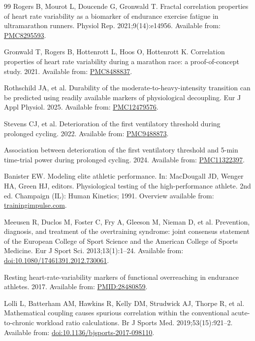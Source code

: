 \documentclass[11pt]{article}
\begin{document}
\begin{thebibliography}{99}
 Rogers B, Mourot L, Doucende G, Gronwald T. Fractal correlation properties of heart rate variability as a biomarker of endurance exercise fatigue in ultramarathon runners. Physiol Rep. 2021;9(14):e14956. Available from: \href{https://pmc.ncbi.nlm.nih.gov/articles/PMC8295593/}{PMC8295593}.

 Gronwald T, Rogers B, Hottenrott L, Hoos O, Hottenrott K. Correlation properties of heart rate variability during a marathon race: a proof-of-concept study. 2021. Available from: \href{https://pmc.ncbi.nlm.nih.gov/articles/PMC8488837/}{PMC8488837}.

 Rothschild JA, et al. Durability of the moderate-to-heavy-intensity transition can be predicted using readily available markers of physiological decoupling. Eur J Appl Physiol. 2025. Available from: \href{https://pmc.ncbi.nlm.nih.gov/articles/PMC12479576/}{PMC12479576}.

 Stevens CJ, et al. Deterioration of the first ventilatory threshold during prolonged cycling. 2022. Available from: \href{https://pmc.ncbi.nlm.nih.gov/articles/PMC9488873/}{PMC9488873}.

 Association between deterioration of the first ventilatory threshold and 5-min time-trial power during prolonged cycling. 2024. Available from: \href{https://pmc.ncbi.nlm.nih.gov/articles/PMC11322397/}{PMC11322397}.

 Banister EW. Modeling elite athletic performance. In: MacDougall JD, Wenger HA, Green HJ, editors. Physiological testing of the high-performance athlete. 2nd ed. Champaign (IL): Human Kinetics; 1991. Overview available from: \href{https://www.trainingimpulse.com/banisters-trimp-0}{trainingimpulse.com}.

 Meeusen R, Duclos M, Foster C, Fry A, Gleeson M, Nieman D, et al. Prevention, diagnosis, and treatment of the overtraining syndrome: joint consensus statement of the European College of Sport Science and the American College of Sports Medicine. Eur J Sport Sci. 2013;13(1):1--24. Available from: \href{https://onlinelibrary.wiley.com/doi/10.1080/17461391.2012.730061}{doi:10.1080/17461391.2012.730061}.

 Resting heart-rate-variability markers of functional overreaching in endurance athletes. 2017. Available from: \href{https://pubmed.ncbi.nlm.nih.gov/28480859/}{PMID:28480859}.

 Lolli L, Batterham AM, Hawkins R, Kelly DM, Strudwick AJ, Thorpe R, et al. Mathematical coupling causes spurious correlation within the conventional acute-to-chronic workload ratio calculations. Br J Sports Med. 2019;53(15):921--2. Available from: \href{https://doi.org/10.1136/bjsports-2017-098110}{doi:10.1136/bjsports-2017-098110}.


\end{thebibliography}
\end{document}
